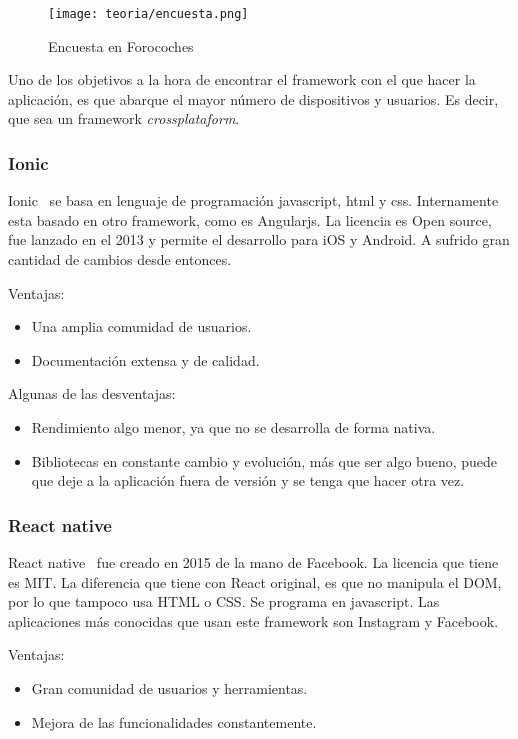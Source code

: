 \begin{figure}[h]
	\centering
	\texttt{[image: teoria/encuesta.png]}
	\caption{Encuesta en Forocoches}\label{fig:encuesta}
\end{figure}

Uno de los objetivos a la hora de encontrar el framework con el que hacer la aplicación, es que abarque el mayor número de dispositivos y usuarios. Es decir, que sea un framework \emph{crossplataform}.

\subsubsection{Ionic}
Ionic~\cite{wiki:ionnic} se basa en lenguaje de programación javascript, html y css. Internamente esta basado en otro framework, como es Angularjs. La licencia es Open source, fue lanzado en el 2013 y permite el desarrollo para iOS y Android. A sufrido gran cantidad de cambios desde entonces.

Ventajas:
\begin{itemize}
	\item Una amplia comunidad de usuarios.
	\item Documentación extensa y de calidad.
\end{itemize}

Algunas de las desventajas:
\begin{itemize}
	\item Rendimiento algo menor, ya que no se desarrolla de forma nativa.
	\item Bibliotecas en constante cambio y evolución, más que ser algo bueno, puede que deje a la aplicación fuera de versión y se tenga que hacer otra vez.
\end{itemize}

\subsubsection{React native}
React native~\cite{wiki:react} fue creado en 2015 de la mano de Facebook. La licencia que tiene es MIT. La diferencia que tiene con React original, es que no manipula el DOM, por lo que tampoco usa HTML o CSS. 
Se programa en javascript. Las aplicaciones más conocidas que usan este framework son Instagram y Facebook.

Ventajas:
\begin{itemize}
	\item Gran comunidad de usuarios y herramientas.
	\item Mejora de las funcionalidades constantemente.
\end{itemize}

